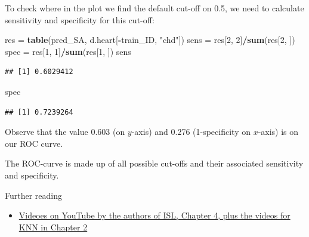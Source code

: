 \documentclass[10pt,ignorenonframetext,]{beamer}
\newenvironment{Shaded}{\begin{snugshade}}{\end{snugshade}}
\newcommand{\KeywordTok}[1]{\textcolor[rgb]{0.13,0.29,0.53}{\textbf{#1}}}
\newcommand{\DecValTok}[1]{\textcolor[rgb]{0.00,0.00,0.81}{#1}}
\newcommand{\StringTok}[1]{\textcolor[rgb]{0.31,0.60,0.02}{#1}}
\newcommand{\OperatorTok}[1]{\textcolor[rgb]{0.81,0.36,0.00}{\textbf{#1}}}
\newcommand{\NormalTok}[1]{#1}
\providecommand{\tightlist}{%
  \setlength{\itemsep}{0pt}\setlength{\parskip}{0pt}}
\begin{document}
\begin{frame}[fragile]

To check where in the plot we find the default cut-off on 0.5, we need
to calculate sensitivity and specificity for this cut-off:

\scriptsize

\begin{Shaded}
\begin{Highlighting}[]
\NormalTok{res =}\StringTok{ }\KeywordTok{table}\NormalTok{(pred_SA, d.heart[}\OperatorTok{-}\NormalTok{train_ID, }\StringTok{"chd"}\NormalTok{])}
\NormalTok{sens =}\StringTok{ }\NormalTok{res[}\DecValTok{2}\NormalTok{, }\DecValTok{2}\NormalTok{]}\OperatorTok{/}\KeywordTok{sum}\NormalTok{(res[}\DecValTok{2}\NormalTok{, ])}
\NormalTok{spec =}\StringTok{ }\NormalTok{res[}\DecValTok{1}\NormalTok{, }\DecValTok{1}\NormalTok{]}\OperatorTok{/}\KeywordTok{sum}\NormalTok{(res[}\DecValTok{1}\NormalTok{, ])}
\NormalTok{sens}
\end{Highlighting}
\end{Shaded}

\begin{verbatim}
## [1] 0.6029412
\end{verbatim}

\begin{Shaded}
\begin{Highlighting}[]
\NormalTok{spec}
\end{Highlighting}
\end{Shaded}

\begin{verbatim}
## [1] 0.7239264
\end{verbatim}

\normalsize
Observe that the value 0.603 (on \(y\)-axis) and 0.276 (1-specificity on
\(x\)-axis) is on our ROC curve.

The ROC-curve is made up of all possible cut-offs and their associated
sensitivity and specificity.

\end{frame}

\begin{frame}{Further reading}

\begin{itemize}
\tightlist
\item
  \href{https://www.youtube.com/playlist?list=PL5-da3qGB5IC4vaDba5ClatUmFppXLAhE}{Videoes
  on YouTube by the authors of ISL, Chapter 4, plus the videos for KNN
  in Chapter 2}
\end{itemize}

\end{frame}
\end{document}
